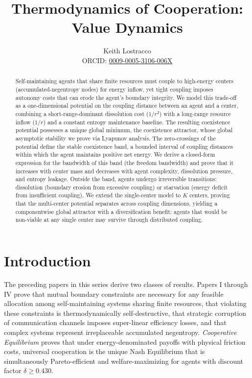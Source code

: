 \documentclass[11pt]{article}
\title{Thermodynamics of Cooperation: Value Dynamics}
\author{%
Keith Lostracco%
\\[0.25em]{\normalsize ORCID: \href{https://orcid.org/0009-0005-3106-006X}{0009-0005-3106-006X}}%
}
\date{}
\theoremstyle{plain}
\theoremstyle{definition}
\theoremstyle{remark}
\let\origsection\section
\renewcommand{\section}{\needspace{12\baselineskip}\origsection}
\begin{document}
\maketitle

\begin{abstract}
Self-maintaining agents that share finite resources must couple to
high-energy centers (accumulated-negentropy nodes) for energy inflow,
yet tight coupling imposes autonomy costs that can erode the agent's
boundary integrity. We model this trade-off as a one-dimensional
potential on the coupling distance between an agent and a center,
combining a short-range-dominant dissolution cost (\(1/r^2\)) with a
long-range resource inflow (\(1/r\)) and a constant entropy maintenance
baseline. The resulting coexistence potential possesses a unique global
minimum, the coexistence attractor, whose global asymptotic stability we
prove via Lyapunov analysis. The zero-crossings of the potential define
the stable coexistence band, a bounded interval of coupling distances
within which the agent maintains positive net energy. We derive a
closed-form expression for the bandwidth of this band (the freedom
bandwidth) and prove that it increases with center mass and decreases
with agent complexity, dissolution pressure, and entropy leakage.
Outside the band, agents undergo irreversible transitions: dissolution
(boundary erosion from excessive coupling) or starvation (energy deficit
from insufficient coupling). We extend the single-center model to \(K\)
centers, proving that the multi-center potential separates across
coupling dimensions, yielding a componentwise global attractor with a
diversification benefit: agents that would be non-viable at any single
center may survive through distributed coupling.
\end{abstract}
\section{Introduction}\label{introduction}

The preceding papers in this series derive two classes of results.
Papers I through IV \citep{TC-I, TC-II, TC-III, TC-IV} prove that mutual
boundary constraints are necessary for any feasible allocation among
self-maintaining systems sharing finite resources, that violating these
constraints is thermodynamically self-destructive, that strategic
corruption of communication channels imposes super-linear efficiency
losses, and that complex systems represent irreplaceable accumulated
negentropy. \emph{Cooperative Equilibrium} \citep{TC-V} proves that
under energy-denominated payoffs with physical friction costs, universal
cooperation is the unique Nash Equilibrium that is simultaneously
Pareto-efficient and welfare-maximizing for agents with discount factor
\(\delta \geq 0.430\).
\end{document}
